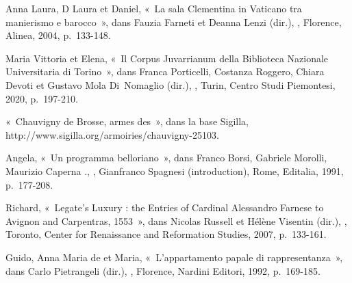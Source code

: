 \begin{teiElement}[name={TEI},change={commons\_edition}]
\begin{teiElement}[name={text},type={book},xmlid={book}]
\begin{teiElement}[name={group},type={book},xmlid={book-001}]
\begin{teiElement}[name={group},type={bibliography},data-page-title={Sources et bibliographie},data-include-href={Ch14\_Source\_bibliographie.xml},xmlid={bibliography-001}]
\begin{teiElement}[name={body}]
\begin{teiDiv}[type={section1},xmlid={div18}]
\begin{teiDiv}[type={section2},xmlid={div19}]
\begin{teiBibl}[xmlid={bibl-347}]
 Anna Laura, D Laura et  Daniel, « La sala Clementina in Vaticano tra manierismo e barocco », dans Fauzia Farneti et Deanna Lenzi (dir.), , Florence, Alinea, 2004, p. 133-148.
\end{teiBibl}
              \begin{teiBibl}[xmlid={bibl-348}]
 Maria Vittoria et  Elena, « Il Corpus Juvarrianum della Biblioteca Nazionale Universitaria di Torino », dans Franca Porticelli, Costanza Roggero, Chiara Devoti et Gustavo Mola Di Nomaglio (dir.), , Turin, Centro Studi Piemontesi, 2020, p. 197-210.
\end{teiBibl}
              \begin{teiBibl}[xmlid={bibl-349}]
« Chauvigny de Brosse, armes des », dans la base Sigilla, http://www.sigilla.org/armoiries/chauvigny-25103.
\end{teiBibl}
              \begin{teiBibl}[xmlid={bibl-350}]
 Angela, « Un programma belloriano », dans Franco Borsi, Gabriele Morolli, Maurizio Caperna ., , Gianfranco Spagnesi (introduction), Rome, Editalia, 1991, p. 177-208.
\end{teiBibl}
              \begin{teiBibl}[xmlid={bibl-351}]
 Richard, « Legate’s Luxury : the Entries of Cardinal Alessandro Farnese to Avignon and Carpentras, 1553 », dans Nicolas Russell et Hélène Visentin (dir.), , Toronto, Center for Renaissance and Reformation Studies, 2007, p. 133-161.
\end{teiBibl}
              \begin{teiBibl}[xmlid={bibl-352}]
 Guido,  Anna Maria de et  Maria, « L’appartamento papale di rappresentanza », dans Carlo Pietrangeli (dir.), , Florence, Nardini Editori, 1992, p. 169-185.
\end{teiBibl}

\end{teiDiv}
\end{teiDiv}
\end{teiElement}
\end{teiElement}
\end{teiElement}
\end{teiElement}
\end{teiElement}
